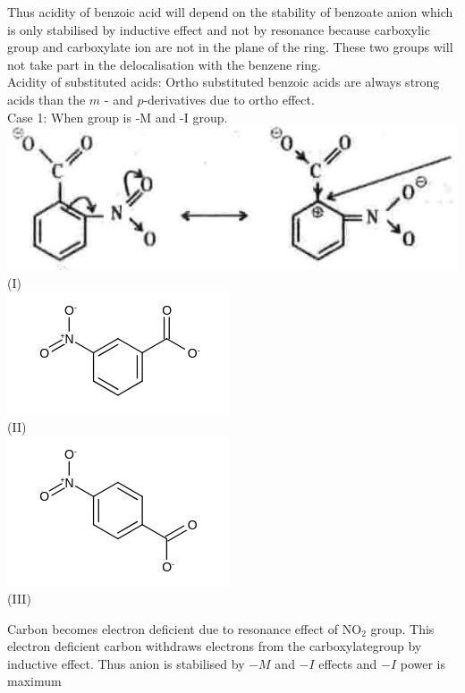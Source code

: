 \documentclass[10pt]{article}
\begin{document}
Thus acidity of benzoic acid will depend on the stability of benzoate anion which is only stabilised by inductive effect and not by resonance because carboxylic group and carboxylate ion are not in the plane of the ring. These two groups will not take part in the delocalisation with the benzene ring.\\
Acidity of substituted acids: Ortho substituted benzoic acids are always strong acids than the $m$ - and $p$-derivatives due to ortho effect.\\
Case 1: When group is -M and -I group.\\
\includegraphics[max width=\textwidth, center]{2025_01_28_8470952b98110cec3aabg-077(2)}\\
(I)\\
\includegraphics{smile-5933f5a68474926d3a3030d633c4bdc3fa962c71}\\
(II)\\
\includegraphics{smile-4f7e1908f93d58ffb2115b430fddf5ebd72edc96}\\
(III)

Carbon becomes electron deficient due to resonance effect of $\mathrm{NO}_{2}$ group. This electron deficient carbon withdraws electrons from the carboxylategroup by inductive effect. Thus anion is stabilised by $-M$ and $-I$ effects and $-I$ power is maximum
\end{document}
